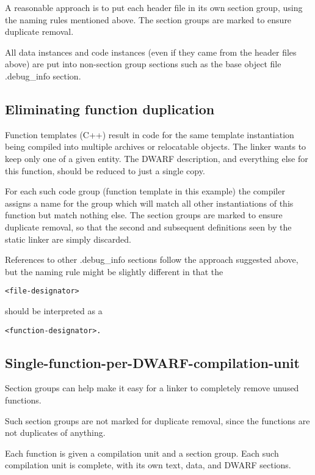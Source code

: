 A reasonable approach is to put each header file in its own
section group, using the naming rules mentioned above. The
section groups are marked to ensure duplicate removal.

All data instances and code instances (even if they came
from the header files above) are put into non-section group
sections such as the base object file .debug\_info section.

\subsection{Eliminating function duplication}
\label{app:eliminatingfunctionduplication}


Function templates (C++) result in code for the same template
instantiation being compiled into multiple archives or
relocatable objects. The linker wants to keep only one of a
given entity. The DWARF description, and everything else for
this function, should be reduced to just a single copy.

For each such code group (function template in this example)
the compiler assigns a name for the group which will match
all other instantiations of this function but match nothing
else. The section groups are marked to ensure duplicate
removal, so that the second and subsequent definitions seen
by the static linker are simply discarded.


References to other .debug\_info sections follow the approach
suggested above, but the naming rule might be slightly
different in that the 
\begin{alltt}
<file-designator> 
\end{alltt}
should be interpreted
as a 
\begin{alltt}
<function-designator>.
\end{alltt}



\subsection{Single-function-per-DWARF-compilation-unit}
\label{app:singlefunctionperdwarfcompilationunit}

Section groups can help make it easy for a linker to completely
remove unused functions.

Such section groups are not marked for duplicate removal,
since the functions are not duplicates of anything.

Each function is given a compilation unit and a section
group. Each such compilation unit is complete, with its own
text, data, and DWARF sections.


